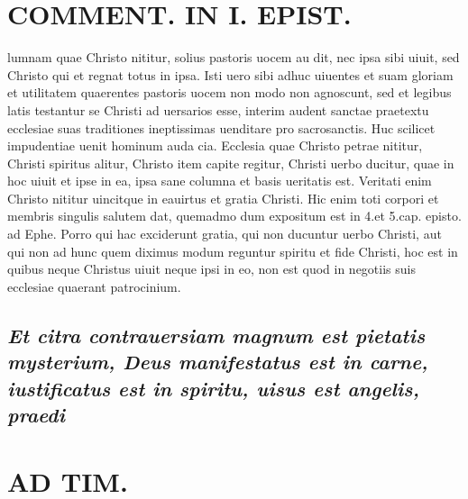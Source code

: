 \documentclass{article}
\begin{document}
\begin{pages}
\section*{COMMENT. IN I. EPIST. }\pstart lumnam quae Christo nititur, solius pastoris uocem au dit, nec ipsa sibi uiuit, sed Christo qui et regnat totus in ipsa. Isti uero sibi adhuc uiuentes et suam gloriam et utilitatem quaerentes pastoris uocem non modo non agnoscunt, sed et legibus latis testantur se Christi ad uersarios esse, interim audent sanctae praetextu ecclesiae suas traditiones ineptissimas uenditare pro sacrosanctis. Huc scilicet impudentiae uenit hominum auda cia. Ecclesia quae Christo petrae nititur, Christi spiritus alitur, Christo item capite regitur, Christi uerbo ducitur, quae in hoc uiuit et ipse in ea, ipsa sane columna et basis ueritatis est. Veritati enim Christo nititur uincitque in eauirtus et gratia Christi. Hic enim toti corpori et membris singulis salutem dat, quemadmo dum expositum est in 4.et 5.cap. episto. ad Ephe. Porro qui hac exciderunt gratia, qui non ducuntur uerbo Christi, aut qui non ad hunc quem diximus modum reguntur spiritu et fide Christi, hoc est in quibus neque Christus uiuit neque ipsi in eo, non est quod in negotiis suis ecclesiae quaerant patrocinium.  \pend
{}
{}
\subsection*{\textit{Et citra contrauersiam magnum est pietatis mysterium, Deus manifestatus est in carne, iustificatus est in spiritu, uisus est angelis, praedi}}
\section*{AD TIM. }
\marginpar{[ p.135 ]}
{}

\end{pages}
\end{document}
